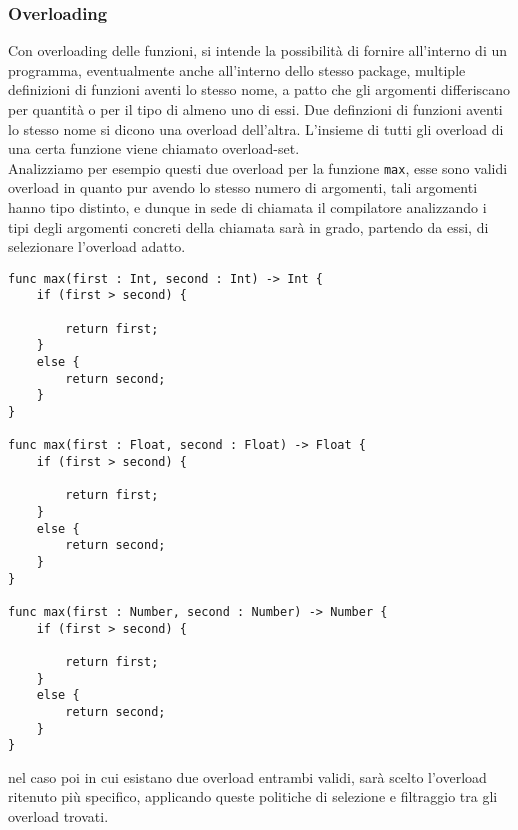 \subsubsection{Overloading}
Con overloading delle funzioni, si intende la possibilità di fornire all’interno 
di un programma, eventualmente anche all’interno dello stesso package, multiple 
definizioni di funzioni aventi lo stesso nome, a patto che gli argomenti differiscano 
per quantità o per il tipo di almeno uno di essi. Due definzioni di funzioni 
aventi lo stesso nome si dicono una overload dell’altra. L’insieme di tutti 
gli overload di una certa funzione viene chiamato overload-set. \\

Analizziamo per esempio questi due overload per la funzione \texttt{max}, esse sono 
validi overload in quanto pur avendo lo stesso numero di argomenti, tali 
argomenti hanno tipo distinto, e dunque in sede di chiamata il compilatore 
analizzando i tipi degli argomenti concreti della chiamata sarà in grado, 
partendo da essi, di selezionare l’overload adatto. \\

\vspace{0.5cm}
\begin{lstlisting}[frame=single]
func max(first : Int, second : Int) -> Int { 
    if (first > second) {

        return first; 
    }
    else {
        return second;
    }
}

func max(first : Float, second : Float) -> Float {
    if (first > second) {

        return first; 
    }
    else {
        return second;
    }
}

func max(first : Number, second : Number) -> Number {
    if (first > second) {

        return first; 
    }
    else {
        return second;
    }
}
\end{lstlisting}
\vspace{0.5cm}

\newpage

nel caso poi in cui esistano due overload entrambi validi, sarà scelto l’overload ritenuto 
più specifico, applicando queste politiche di selezione e filtraggio tra gli overload trovati.

